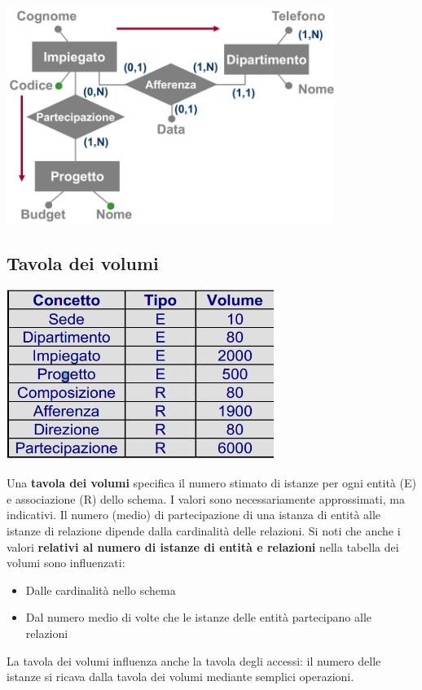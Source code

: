 \documentclass[12pt]{article}
\begin{document}
\begin{center}
    \includegraphics[width = 0.80\textwidth]{Images/95.PNG}
\end{center}
\subsection{Tavola dei volumi}
\begin{center}
    \includegraphics[width = 0.65\textwidth]{Images/96.PNG}
\end{center}
Una \textbf{tavola dei volumi} specifica il numero stimato di istanze per ogni entità (E) e associazione (R) dello schema.
I valori sono necessariamente approssimati, ma indicativi.
Il numero (medio) di partecipazione di una istanza di entità alle istanze di relazione dipende dalla cardinalità delle relazioni.
Si noti che anche i valori \textbf{relativi al numero di istanze di entità e relazioni} nella tabella dei volumi sono influenzati:
\begin{itemize}
    \item Dalle cardinalità nello schema
    \item Dal numero medio di volte che le istanze delle entità partecipano alle relazioni
\end{itemize}
La tavola dei volumi influenza anche la tavola degli accessi: il numero delle istanze si ricava dalla tavola dei volumi mediante semplici operazioni.
\end{document}
